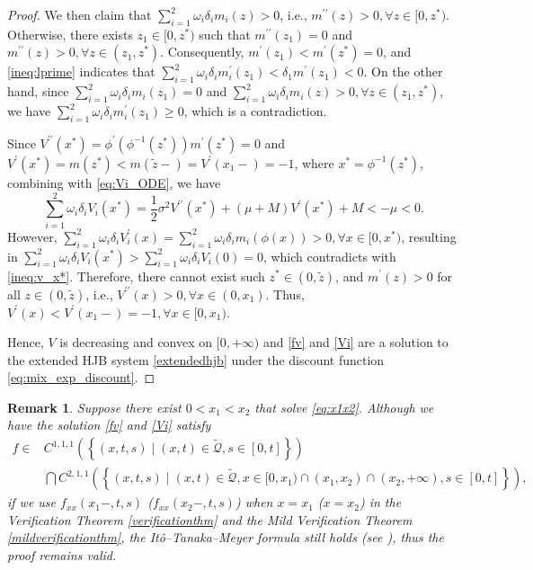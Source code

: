 \documentclass[11pt,reqno]{article}%
\newtheorem{remark}[theorem]{Remark}
\numberwithin{equation}{section}
\begin{document}
\begin{proof}
We then claim that $\sum\limits_{i=1}^{2}\omega_i \delta_i m_i(z)>0$, i.e., $m^{\prime\prime}(z) > 0, \forall z\in[0,z^*)$. Otherwise, there exists $z_1\in[0,z^*)$ such that $m^{\prime\prime}(z_1)=0$ and $m^{\prime\prime}(z)>0, \forall z\in(z_1,z^*)$.  Consequently, $m^{\prime}(z_1) < m^{\prime}(z^*) = 0$, and  \eqref{ineq:lprime} indicates that  $\sum\limits_{i=1}^{2}\omega_i \delta_i m^\prime_i(z_1)<\delta_1 m^\prime(z_1)<0$. On the other hand, since $\sum\limits_{i=1}^{2}\omega_i \delta_i m_i(z_1)=0$ and $\sum\limits_{i=1}^{2}\omega_i \delta_i m_i(z)>0, \forall z\in(z_1,z^*)$, we have $\sum\limits_{i=1}^{2}\omega_i \delta_i m^\prime_i(z_1)\ge 0$, which is a contradiction.

Since $V^{\prime\prime}(x^*)=\phi^\prime(\phi^{-1}(z^*))m^{\prime}(z^*)=0$ and $V^{\prime}(x^*)=m(z^*)<m(\tilde z-)=V^{\prime}(x_1-)=-1$, where $x^* = \phi^{-1}(z^*)$, combining with \eqref{eq:Vi_ODE}, we have
\begin{equation}\label{ineq:v_x*}
\sum\limits_{i=1}^{2}\omega_i \delta_i V_i(x^*) = \frac{1}{2} \sigma^2 V^{\prime\prime}(x^*) + (\mu + M) V^{\prime}(x^*) + M < -\mu<0.
\end{equation}
However, $\sum\limits_{i=1}^{2}\omega_i \delta_i V_i^{\prime}(x)=\sum\limits_{i=1}^{2}\omega_i \delta_i m_i(\phi(x))>0, \forall x\in[0,x^*)$, resulting in $\sum\limits_{i=1}^{2}\omega_i \delta_i V_i(x^*)>\sum\limits_{i=1}^{2}\omega_i \delta_i V_i(0)=0$, which contradicts with \eqref{ineq:v_x*}. Therefore, there cannot exist such $z^* \in (0, \tilde z)$, and $m^\prime(z) > 0$ for all $z \in (0, \tilde z)$, i.e., $V^{\prime\prime}(x) > 0, \forall x\in(0,x_1)$. Thus, $V^{\prime}(x)<V^{\prime}(x_1-)=-1, \forall x\in[0,x_1)$. 

Hence, $V$ is decreasing and convex on $[0,+\infty)$ and \eqref{fv} and \eqref{Vi} are a solution to the extended HJB system \eqref{extendedhjb} under the discount function \eqref{eq:mix_exp_discount}.
\end{proof}


\begin{remark}\label{differ}
Suppose there exist  $0 < x_1 < x_2$  that solve \eqref{eq:x1x2}. Although we have the solution \eqref{fv} and \eqref{Vi} satisfy
\begin{equation}
\begin{aligned}
f\in &C^{1,1,1}\left(\left\{(x,t,s)\mid (x,t)\in\mathcal{\tilde{Q}}, s\in [0,t]\right\}\right)\\&\bigcap C^{2,1,1}\left(\left\{(x,t,s)\mid (x,t)\in\mathcal{\tilde{Q}},x\in[0,x_1)\cap(x_1,x_2)\cap(x_2,+\infty), s\in [0,t]\right\}\right),\end{aligned}\nonumber
\end{equation}
if we use $f_{xx}(x_1-,t,s)$ ($f_{xx}(x_2-,t,s)$) when $x=x_1$ ($x=x_2$) in the Verification Theorem \ref{verificationthm} and the Mild Verification Theorem \ref{mildverificationthm}, the It\^{o}--Tanaka--Meyer formula still holds (see \citet[Theorem 3.1 and Remark 3.3]{peskir2007change}), thus the proof remains valid. 
\end{remark}
\end{document}
